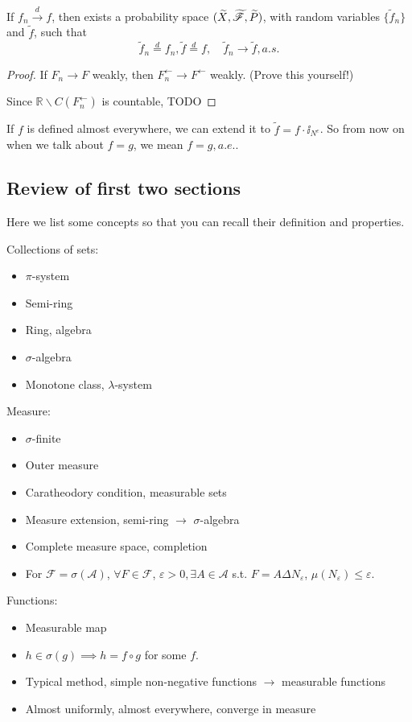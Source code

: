 \begin{theorem}[Skorokhod]
    If $f_n \xrightarrow{d} f$, then exists a probability
	space $(\widetilde{X},\widetilde{\mathscr{F}}, \widetilde{P})$,
	with random variables $\{\tilde f_n\}$ and $\tilde f$, such that
	\[
	\tilde f_n \overset{d}{=} f_n, \tilde f \overset{d}{=} f,\quad
	\tilde f_n \to \tilde f, a.s.
	\]
\end{theorem}
\begin{proof}[Proof]
    If $F_n \to F$ weakly, then $F_n^\leftarrow \to F^\leftarrow$ weakly.
	(Prove this yourself!)

	Since $\mathbb{R} \backslash C(F_n^\leftarrow)$ is countable,
	TODO
\end{proof}

If $f$ is defined almost everywhere,
we can extend it to $\tilde f = f \cdot \ii_{N^c}$.
So from now on when we talk about $f = g$, we mean $f = g,a.e.$.

\subsection{Review of first two sections}
\label{sub:Review of first two sections}

Here we list some concepts so that you can recall their definition and properties.

Collections of sets:
\begin{itemize}
	\item $\pi$-system
	\item Semi-ring
	\item Ring, algebra
	\item $\sigma$-algebra
	\item Monotone class, $\lambda$-system
\end{itemize}

Measure:
\begin{itemize}
	\item $\sigma$-finite
	\item Outer measure
	\item Caratheodory condition, measurable sets
	\item Measure extension, semi-ring $\to$ $\sigma$-algebra
	\item Complete measure space, completion
	\item For $\mathscr{F} = \sigma(\mathscr{A})$, $\forall F\in \mathscr{F}$,
		$\varepsilon>0, \exists A\in \mathscr{A}$ s.t.
		$F = A\Delta N_\varepsilon$, $\mu(N_\varepsilon)\le \varepsilon$.
\end{itemize}

Functions:
\begin{itemize}
	\item Measurable map
	\item $h \in \sigma(g)\implies h = f\circ g$ for some $f$.
	\item Typical method, simple non-negative functions $\to$ measurable functions
	\item Almost uniformly, almost everywhere, converge in measure
\end{itemize}
